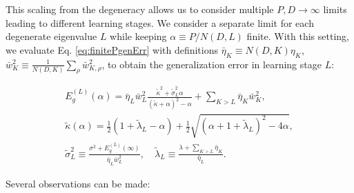 \documentclass[11pt]{article}
\begin{document}
This scaling from the degeneracy allows us to consider multiple $P, D \to \infty$ limits leading to different learning stages. We consider a separate limit for each degenerate eigenvalue $L$ while keeping $\alpha \equiv P/N(D,L)$ finite. With this setting, we evaluate Eq. \eqref{eq:finitePgenErr} with definitions $
    \bar\eta_K \equiv N(D,K)\eta_K$,  $\bar w_{K}^2 \equiv \frac{1}{N(D,K)}\sum_\rho \bar w_{K,\rho}^2$,
to obtain the generalization error in learning stage $L$:
%
\begin{linenomath*}\begin{equation}\label{eq:asympGenErr}
\begin{gathered}
E^{(L)}_g(\alpha)=\bar\eta_{L}\bar w_{L}^2 \frac{\tilde \kappa^2+\tilde\sigma_{L}^2\alpha}{(\tilde \kappa + \alpha)^2-\alpha}+\sum_{K>L}\bar\eta_{K}\bar w_{K}^2,\\
	\tilde \kappa(\alpha) = \frac{1}{2}(1+\tilde\lambda_{L}-\alpha)+\frac{1}{2}\sqrt{(\alpha+1+\tilde\lambda_{L})^2-4\alpha},\\
	\tilde \sigma_{L}^2 \equiv \frac {\sigma^2+E^{(L)}_g(\infty)}{\bar\eta_{L}\bar w_{L}^2},\quad \tilde\lambda_{L} \equiv  \frac{\lambda+\sum_{K>L}\bar\eta_{K}}{\bar\eta_{L}}.
\end{gathered}
\end{equation}\end{linenomath*}
%
Several observations can be made:
\end{document}
